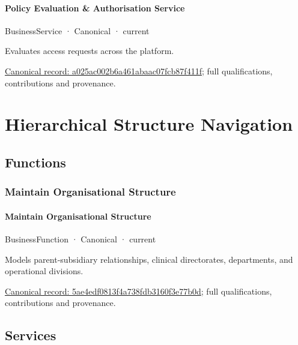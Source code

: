 \paragraph{Policy Evaluation \& Authorisation Service}

\label{element:a025ac002b6a461abaac07fcb87f411f}
{\small BusinessService · Canonical · current}\par

Evaluates access requests across the platform.


{\footnotesize \href{../../../../continuum/business/business-service/a025ac002b6a461abaac07fcb87f411f.md}{Canonical record: a025ac002b6a461abaac07fcb87f411f}; full qualifications, contributions and provenance.}\par
\section{Hierarchical Structure Navigation}

\subsection{Functions}

\subsubsection{Maintain Organisational Structure}

\paragraph{Maintain Organisational Structure}

\label{element:5ae4edf0813f4a738fdb3160f3e77b0d}
{\small BusinessFunction · Canonical · current}\par

Models parent-subsidiary relationships, clinical directorates, departments, and operational divisions.


{\footnotesize \href{../../../../continuum/business/business-function/5ae4edf0813f4a738fdb3160f3e77b0d.md}{Canonical record: 5ae4edf0813f4a738fdb3160f3e77b0d}; full qualifications, contributions and provenance.}\par
\subsection{Services}

